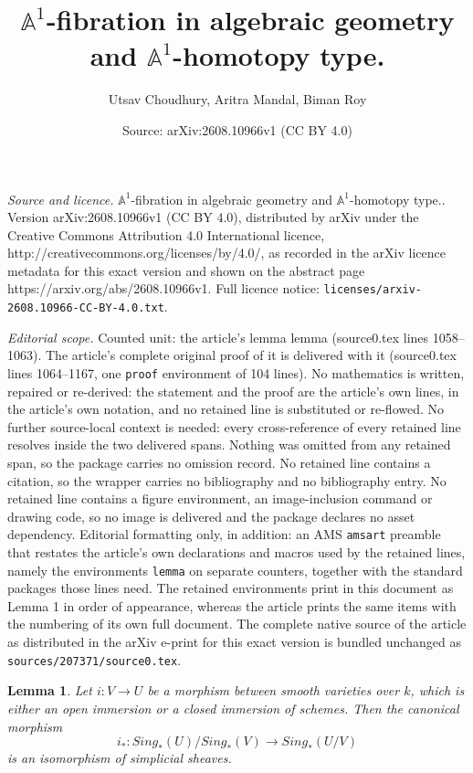 \documentclass[10pt,a4paper]{amsart}
\title{$\mathbb{A}^1$-fibration in algebraic geometry and $\mathbb{A}^1$-homotopy type.}
\author{Utsav Choudhury, Aritra Mandal, Biman Roy}
\date{Source: arXiv:2608.10966v1 (CC BY 4.0)}
\newtheorem{lemma}{Lemma}
\begin{document}
\maketitle

\noindent\emph{Source and licence.} $\mathbb{A}^1$-fibration in algebraic geometry and $\mathbb{A}^1$-homotopy type.. Version arXiv:2608.10966v1 (CC BY 4.0), distributed by arXiv under the Creative Commons Attribution 4.0 International licence, http://creativecommons.org/licenses/by/4.0/, as recorded in the arXiv licence metadata for this exact version and shown on the abstract page https://arxiv.org/abs/2608.10966v1. Full licence notice: \texttt{licenses/arxiv-2608.10966-CC-BY-4.0.txt}.\par\smallskip

\noindent\textit{Editorial scope.} Counted unit: the article's lemma lemma (source0.tex lines 1058--1063). The article's complete original proof of it is delivered with it (source0.tex lines 1064--1167, one \texttt{proof} environment of 104 lines). No mathematics is written, repaired or re-derived: the statement and the proof are the article's own lines, in the article's own notation, and no retained line is substituted or re-flowed.  No further source-local context is needed: every cross-reference of every retained line resolves inside the two delivered spans.  Nothing was omitted from any retained span, so the package carries no omission record.  No retained line contains a citation, so the wrapper carries no bibliography and no bibliography entry.  No retained line contains a figure environment, an image-inclusion command or drawing code, so no image is delivered and the package declares no asset dependency.  Editorial formatting only, in addition: an AMS \texttt{amsart} preamble that restates the article's own declarations and macros used by the retained lines, namely the environments \texttt{lemma} on separate counters, together with the standard packages those lines need.  The retained environments print in this document as Lemma 1 in order of appearance, whereas the article prints the same items with the numbering of its own full document.  The complete native source of the article as distributed in the arXiv e-print for this exact version is bundled unchanged as \texttt{sources/207371/source0.tex}.
\begin{lemma} \label{key lemma}
    Let $i:V \to U$ be a morphism between smooth varieties over $k$, which is either an open immersion or a closed immersion of schemes. Then the canonical morphism
    $$i_*: Sing_*(U)/Sing_*(V) \to Sing_*(U/V)$$
    is an isomorphism of simplicial sheaves.
\end{lemma}
\end{document}
